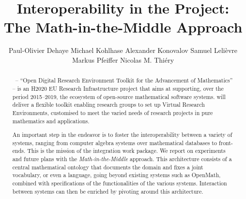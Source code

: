 \documentclass{llncs}
\title{Interoperability in the \ODK Project:\\
The Math-in-the-Middle Approach}
\author{Paul-Olivier Dehaye\inst{1} Michael Kohlhase\inst{2} Alexander
  Konovalov\inst{3} Samuel Lelièvre\inst{4} Markus
  Pfeiffer\inst{3} Nicolas M. Thiéry\inst{4}}
\institute{
  University of Z\"urich \and 
  Jacobs University \and 
  University of St~Andrews \and
  Universit\'e Paris-Sud
}
\begin{document}
\maketitle
\begin{abstract}
  \ODK\, -- ``Open Digital Research Environment Toolkit for the Advancement of
  Mathematics'' -- is an H2020 EU Research Infrastructure project that aims at supporting,
  over the period 2015--2019, the ecosystem of open-source mathematical software
  systems. \ODK will deliver a flexible toolkit enabling research groups to set
  up Virtual Research Environments, customised to meet the varied needs of research
  projects in pure mathematics and applications.

  An important step in the \ODK endeavor is to foster the interoperability between a
  variety of systems, ranging from computer algebra systems over mathematical databases to
  front-ends. This is the mission of the integration work package. We report on
  experiments and future plans with the \emph{Math-in-the-Middle} approach. This
  architecture consists of a central mathematical ontology that documents the domain and
  fixes a joint vocabulary, or even a language, going beyond existing systems such as
  OpenMath, combined with specifications of the functionalities of the various
  systems. Interaction between systems can then be enriched by pivoting around this
  architecture.
\end{abstract}








\printbibliography
\end{document}
